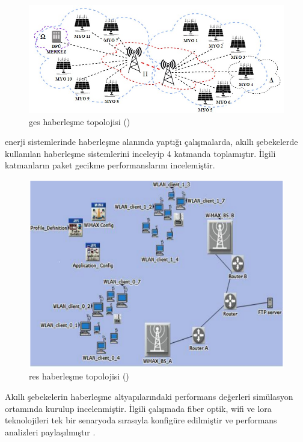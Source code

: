 \begin{figure}[htbp]
\centerline{\includegraphics[width=\columnwidth]{Resim/makaledonmez.jpg}}
\caption{\gls{ges} haberleşme topolojisi (\protect{}) }
\label{sekildonmezmakale}
\end{figure}

\cite{eltamaly2021iot} enerji sistemlerinde haberleşme alanında yaptığı çalışmalarda, akıllı şebekelerde kullanılan haberleşme sistemlerini inceleyip 4 katmanda toplamıştır. İlgili katmanların paket gecikme performanslarını incelemiştir.

\begin{figure}[htbp]
\centerline{\includegraphics[width=12cm]{Resim/Sekil2-3.png}}
\caption{\gls{res} haberleşme topolojisi (\protect{}) }
\label{fig:figure4}
\end{figure}

Akıllı şebekelerin haberleşme altyapılarındaki performans değerleri simülasyon ortamında kurulup incelenmiştir. İlgili çalışmada fiber optik, \gls{wifi} ve \gls{lora} teknolojileri tek bir senaryoda sırasıyla konfigüre edilmiştir ve performans analizleri paylaşılmıştır \cite{yuan2020modeling}. 



